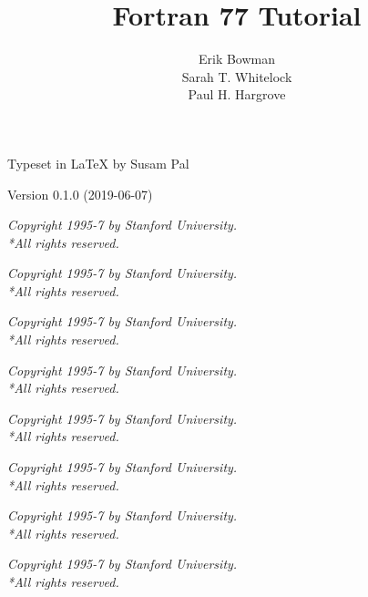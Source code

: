 \documentclass{article}
\title{Fortran 77 Tutorial}
\author{
    Erik Bowman \\
    Sarah T. Whitelock \\
    Paul H. Hargrove \\
}
\date{}
\newcommand{\footer}{
    \medskip
    \textit{Copyright \textcopyright{} 1995-7 by Stanford University.
            \ifdefined\mini\\*\fi All rights reserved.}
}
\newcommand{\newsection}[1]{
    
    
    \footer
    \newpage
}
\begin{document}
\maketitle
\thispagestyle{empty}
\begin{center}
\small
Typeset in \LaTeX{} by Susam Pal

Version 0.1.0 (2019-06-07)
\end{center}
\newpage

{
    \ifdefined\mini\small\fi
    \tableofcontents
}
\newpage

\newsection{00_test}
\newsection{01_preface}
\newsection{02_whatis}
\newsection{03_basics}
\newsection{04_unix}
\newsection{05_variables}
\newsection{06_expressions}
\newsection{07_logical}
\end{document}
